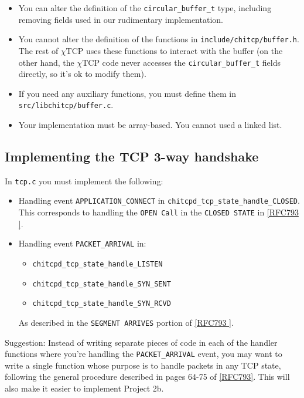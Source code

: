 \documentclass[10pt]{article}
\newcommand{\chitcp}{$\chi$\textsf{TCP} }
\newcommand{\RFC}[1]{\href{http://tools.ietf.org/html/rfc#1}{[RFC#1]}}
\newcommand{\RFCsection}[2]{\href{http://tools.ietf.org/html/rfc#1\#section-#2}{[RFC#1 \textsection #2]}}
\begin{document}
\begin{itemize}
 \item You can alter the definition of the \texttt{circular\_buffer\_t} type, including removing fields used in our rudimentary implementation.
 \item You cannot alter the definition of the functions in \texttt{include/chitcp/buffer.h}. The rest of \chitcp uses these functions to interact with the buffer (on the other hand, the \chitcp code never accesses the \texttt{circular\_buffer\_t} fields directly, so it's ok to modify them).
 \item If you need any auxiliary functions, you must define them in \texttt{src/libchitcp/buffer.c}.
 \item Your implementation must be array-based. You cannot used a linked list.
\end{itemize}



\subsection*{Implementing the TCP 3-way handshake}

In \texttt{tcp.c} you must implement the following:

\begin{itemize}
 \item Handling event \texttt{APPLICATION\_CONNECT} in \texttt{chitcpd\_tcp\_state\_handle\_CLOSED}. This corresponds to handling the \texttt{OPEN Call} in the \texttt{CLOSED STATE} in \RFCsection{793}{3.9}.
 
 \item Handling event \texttt{PACKET\_ARRIVAL} in:
 \begin{itemize}
 \item  \texttt{chitcpd\_tcp\_state\_handle\_LISTEN}
 \item  \texttt{chitcpd\_tcp\_state\_handle\_SYN\_SENT}
 \item  \texttt{chitcpd\_tcp\_state\_handle\_SYN\_RCVD}
 \end{itemize}
 
As described in the \texttt{SEGMENT ARRIVES} portion of \RFCsection{793}{3.9}.
\end{itemize}

Suggestion: Instead of writing separate pieces of code in each of the handler functions where you're handling the \texttt{PACKET\_ARRIVAL} event, you may want to write a single function whose purpose is to handle packets in any TCP state, following the general procedure described in pages 64-75 of \RFC{793}. This will also make it easier to implement Project 2b.
\end{document}
